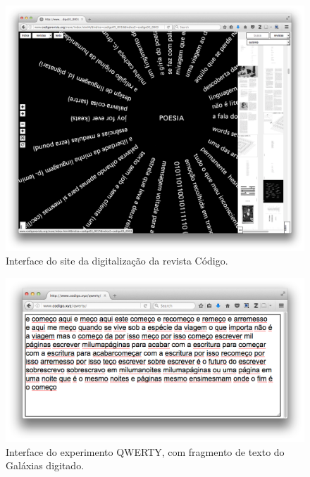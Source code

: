 \begin{figure}
    \caption{\label{codigo}Interface do site da digitalização da revista Código. }
    \begin{center}
    \includegraphics[width=1\linewidth]{pictures/cap3/codigo5.png}
    \end{center}
\end{figure}

\begin{figure}
    \caption{\label{qwerty}Interface do experimento QWERTY, com fragmento de texto do Galáxias digitado. }
    \begin{center}
    \includegraphics[width=1\linewidth]{pictures/cap3/qwerty.png}
    \end{center}
\end{figure}

